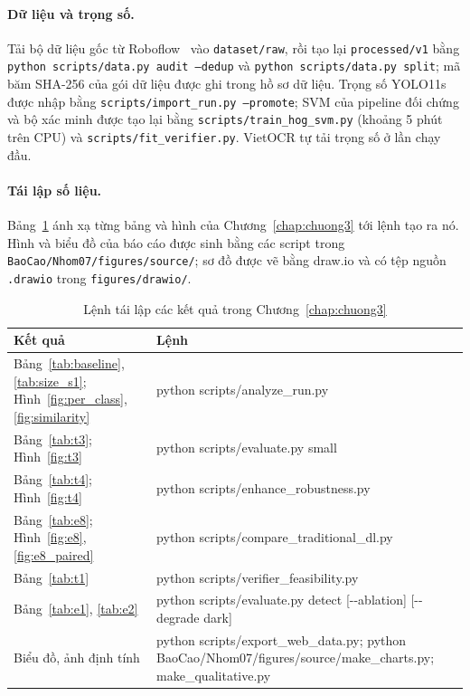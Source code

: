 \paragraph{Dữ liệu và trọng số.} Tải bộ dữ liệu gốc từ Roboflow~\cite{roboflow_dataset} vào \texttt{dataset/raw}, rồi tạo lại \texttt{processed/v1} bằng \texttt{python scripts/data.py audit --dedup} và \texttt{python scripts/data.py split}; mã băm SHA-256 của gói dữ liệu được ghi trong hồ sơ dữ liệu. Trọng số YOLO11s được nhập bằng \texttt{scripts/import\_run.py --promote}; SVM của pipeline đối chứng và bộ xác minh được tạo lại bằng \texttt{scripts/train\_hog\_svm.py} (khoảng 5 phút trên CPU) và \texttt{scripts/fit\_verifier.py}. VietOCR tự tải trọng số ở lần chạy đầu.

\paragraph{Tái lập số liệu.} Bảng~\ref{tab:reproduce} ánh xạ từng bảng và hình của Chương~\ref{chap:chuong3} tới lệnh tạo ra nó. Hình và biểu đồ của báo cáo được sinh bằng các script trong \texttt{BaoCao/Nhom07/figures/source/}; sơ đồ được vẽ bằng draw.io và có tệp nguồn \texttt{.drawio} trong \texttt{figures/drawio/}.

\begin{table}[H]
\centering
\caption{Lệnh tái lập các kết quả trong Chương~\ref{chap:chuong3}}
\label{tab:reproduce}
\footnotesize
\begin{tabularx}{\textwidth}{|>{\raggedright\arraybackslash}p{3.6cm}|>{\ttfamily\raggedright\arraybackslash}X|}
\toprule
\textbf{Kết quả} & \textbf{\normalfont Lệnh} \\
\midrule
Bảng~\ref{tab:baseline}, \ref{tab:size_s1}; Hình~\ref{fig:per_class}, \ref{fig:similarity} & python scripts/analyze\_run.py \\ \hline
Bảng~\ref{tab:t3}; Hình~\ref{fig:t3} & python scripts/evaluate.py small \\ \hline
Bảng~\ref{tab:t4}; Hình~\ref{fig:t4} & python scripts/enhance\_robustness.py \\ \hline
Bảng~\ref{tab:e8}; Hình~\ref{fig:e8}, \ref{fig:e8_paired} & python scripts/compare\_traditional\_dl.py \\ \hline
Bảng~\ref{tab:t1} & python scripts/verifier\_feasibility.py \\ \hline
Bảng~\ref{tab:e1}, \ref{tab:e2} & python scripts/evaluate.py detect [-{}-ablation] [-{}-degrade dark] \\ \hline
Biểu đồ, ảnh định tính & python scripts/export\_web\_data.py; python BaoCao/Nhom07/figures/source/make\_charts.py; make\_qualitative.py \\
\bottomrule
\end{tabularx}
\end{table}

